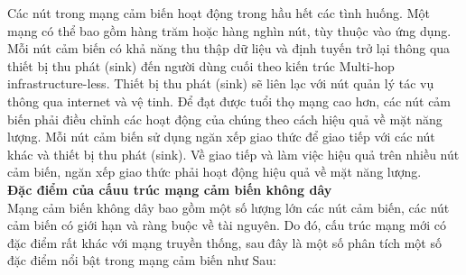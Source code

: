 \documentclass{report}
\begin{document}
Các nút trong mạng cảm biến hoạt động trong hầu hết các tình huống. Một mạng có thể bao gồm hàng trăm hoặc hàng nghìn nút, tùy thuộc vào ứng dụng. Mỗi nút cảm biến có khả năng thu thập dữ liệu và định tuyến trở lại thông qua thiết bị thu phát (sink) đến người dùng cuối theo kiến trúc Multi-hop infrastructure-less. Thiết bị thu phát (sink) sẽ liên lạc với nút quản lý tác vụ thông qua internet và vệ tinh. Để đạt được tuổi thọ mạng cao hơn, các nút cảm biến phải điều chỉnh các hoạt động của chúng theo cách hiệu quả về mặt năng lượng. Mỗi nút cảm biến sử dụng ngăn xếp giao thức để giao tiếp với các nút khác và thiết bị thu phát (sink). Về giao tiếp và làm việc hiệu quả trên nhiều nút cảm biến, ngăn xếp giao thức phải hoạt động hiệu quả về mặt năng lượng. \\

\noindent
\textbf{Đặc điểm của cấuu trúc mạng cảm biến không dây} \\
\indent
Mạng cảm biến không dây bao gồm một số lượng lớn các nút cảm biến, các nút cảm biến có
giới hạn và ràng buộc về tài nguyên. Do đó, cấu trúc mạng mới có đặc điểm rất khác với mạng
truyền thống, sau đây là một số phân tích một số đặc điểm nổi bật trong mạng cảm biến như
Sau:
\end{document}
